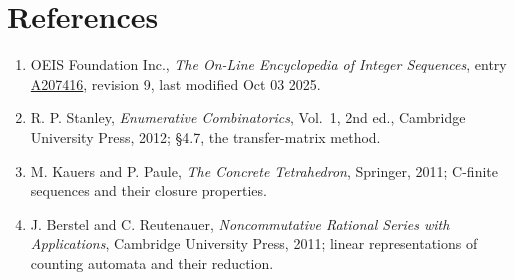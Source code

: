 \documentclass[11pt]{article}
\theoremstyle{definition}
\begin{document}
\section{References}

\begin{enumerate}

\item OEIS Foundation Inc., \emph{The On-Line Encyclopedia of Integer Sequences}, entry \href{https://oeis.org/A207416}{A207416}, revision 9, last modified Oct 03 2025.

\item R. P. Stanley, \emph{Enumerative Combinatorics}, Vol.~1, 2nd ed., Cambridge University Press, 2012; \S4.7, the transfer-matrix method.

\item M. Kauers and P. Paule, \emph{The Concrete Tetrahedron}, Springer, 2011; C-finite sequences and their closure properties.

\item J. Berstel and C. Reutenauer, \emph{Noncommutative Rational Series with Applications}, Cambridge University Press, 2011; linear representations of counting automata and their reduction.

\end{enumerate}
\end{document}
